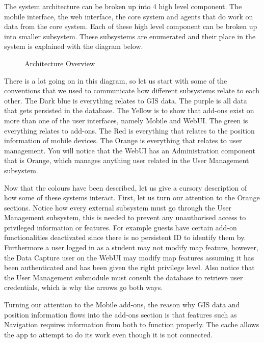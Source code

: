 The system architecture can be broken up into 4 high level component. The mobile interface, the web interface, the core system and agents that do work on data from the core system. Each of these high level component can be broken up into smaller subsystem. These subsystems are enumerated and their place in the system is explained with the diagram below.

\begin{figure}[h]
\caption{Architecture Overview}
\end{figure}
There is a lot going on in this diagram, so let us start with some of the conventions that we used to communicate how different subsystems relate to each other. The Dark blue is everything relates to GIS data. The purple is all data that gets persisted in the database. The Yellow is to show that add-ons exist on more than one of the user interfaces, namely Mobile and WebUI. The green is everything relates to add-ons. The Red is everything that relates to the position information of mobile devices. The Orange is everything that relates to user management. You will notice that the WebUI has an Administration component that is Orange, which manages anything user related in the User Management subsystem.\par
\bigskip
\noindent
Now that the colours have been described, let us give a cursory description of how some of these systems interact. First, let us  turn our attention to the Orange sections. Notice how every external subsystem must go through the User Management subsystem, this is needed to prevent any unauthorised access to privileged information or features. For example guests have certain add-on functionalities deactivated since there is no persistent ID to identify them by. Furthermore a user logged in as a student may not modify map feature, however, the Data Capture user on the WebUI may modify map features assuming it has been authenticated and has been given the right privilege level. Also notice that the User Management submodule must consult the database to retrieve user credentials, which is why the arrows go both ways.\par\noindent
Turning our attention to the Mobile add-ons, the reason why GIS data and position information flows into the add-ons section is that features such as Navigation requires information from both to function properly. The cache allows the app to attempt to do its work even though it is not connected.\par\noindent
